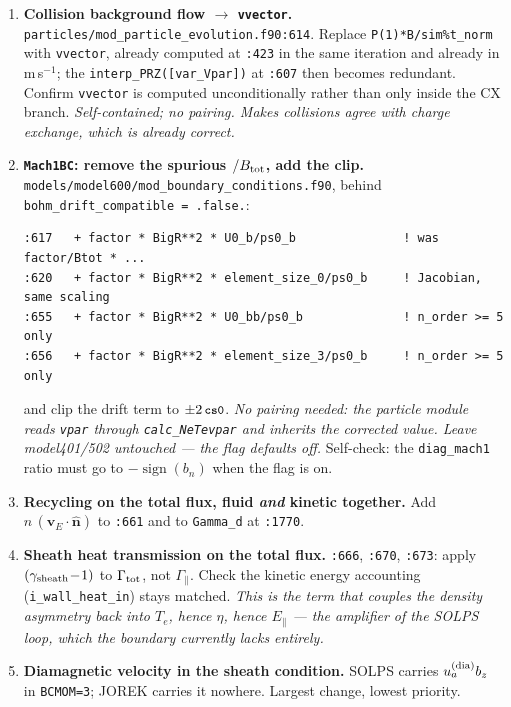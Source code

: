 \documentclass[11pt,a4paper]{article}
\newcommand{\code}[1]{\texttt{\small #1}}
\newcommand{\vE}{\bm v_E}\newcommand{\nhat}{\hat{\bm n}}\newcommand{\that}{\hat{\bm t}}
\begin{document}
\begin{enumerate}\itemsep6pt

\item[\textbf{0.}] \textbf{Collision background flow $\to$ \code{vvector}.}
\code{particles/mod\_particle\_evolution.f90:614}. Replace
\code{P(1)*B/sim\%t\_norm} with \code{vvector}, already computed at \code{:423} in the same
iteration and already in m\,s$^{-1}$; the \code{interp\_PRZ([var\_Vpar])} at \code{:607}
then becomes redundant. Confirm \code{vvector} is computed unconditionally rather than only
inside the CX branch. \emph{Self-contained; no pairing. Makes collisions agree with charge
exchange, which is already correct.}

\item[\textbf{1.}] \textbf{\code{Mach1BC}: remove the spurious $/B_{\rm tot}$, add the clip.}
\code{models/model600/mod\_boundary\_conditions.f90}, behind
\code{bohm\_drift\_compatible = .false.}:
\begin{lstlisting}
:617   + factor * BigR**2 * U0_b/ps0_b               ! was factor/Btot * ...
:620   + factor * BigR**2 * element_size_0/ps0_b     ! Jacobian, same scaling
:655   + factor * BigR**2 * U0_bb/ps0_b              ! n_order >= 5 only
:656   + factor * BigR**2 * element_size_3/ps0_b     ! n_order >= 5 only
\end{lstlisting}
and clip the drift term to $\pm2\,\code{cs0}$. \emph{No pairing needed: the particle module
reads \code{vpar} through \code{calc\_NeTevpar} and inherits the corrected value. Leave
model401/502 untouched --- the flag defaults off.} Self-check: the \code{diag\_mach1} ratio
must go to $-\operatorname{sign}(b_n)$ when the flag is on.

\item[\textbf{2+3.}] \textbf{Recycling on the total flux, fluid \emph{and} kinetic together.}
Add $n\,(\vE\!\cdot\!\nhat)$ to \code{:661} and to \code{Gamma\_d} at \code{:1770}.

\item[\textbf{4.}] \textbf{Sheath heat transmission on the total flux.}
\code{:666}, \code{:670}, \code{:673}: apply $(\gamma_{\rm sheath}\!-\!1)$ to
$\Gamma_{\rm tot}$, not $\Gamma_\parallel$. Check the kinetic energy accounting
(\code{i\_wall\_heat\_in}) stays matched. \emph{This is the term that couples the density
asymmetry back into $T_e$, hence $\eta$, hence $E_\parallel$ --- the amplifier of the SOLPS
loop, which the boundary currently lacks entirely.}

\item[\textbf{5.}] \textbf{Diamagnetic velocity in the sheath condition.} SOLPS carries
$u^{(\rm dia)}_a b_z$ in \code{BCMOM=3}; JOREK carries it nowhere. Largest change, lowest
priority.
\end{enumerate}
\end{document}
